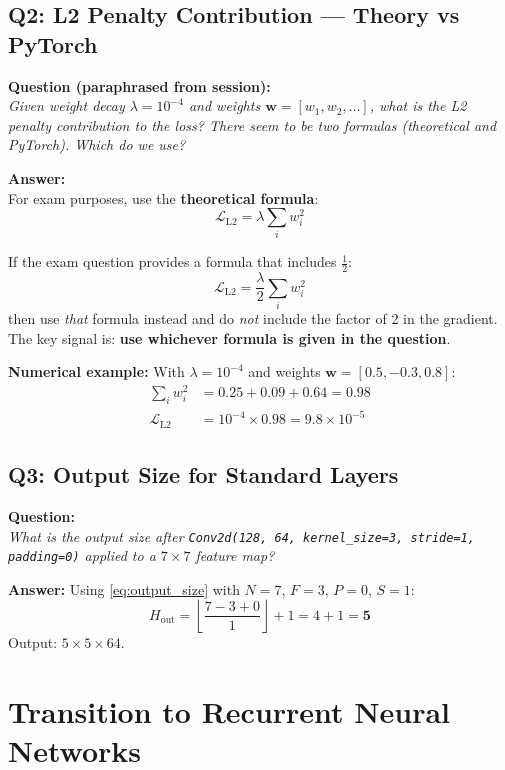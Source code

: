 \documentclass[12pt,a4paper]{article}
\newcommand{\floor}[1]{\left\lfloor #1 \right\rfloor}
\begin{document}
\subsection{Q2: L2 Penalty Contribution --- Theory vs PyTorch}

\textbf{Question (paraphrased from session):} \\
\textit{Given weight decay $\lambda = 10^{-4}$ and weights
$\mathbf{w} = [w_1, w_2, \ldots]$, what is the L2 penalty contribution to
the loss? There seem to be two formulas (theoretical and PyTorch). Which do
we use?}

\textbf{Answer:} \\
For exam purposes, use the \textbf{theoretical formula}:
\begin{equation}
  \mathcal{L}_{\mathrm{L2}} = \lambda \sum_i w_i^2
  \label{eq:l2_penalty_qa}
\end{equation}

If the exam question provides a formula that includes $\tfrac{1}{2}$:
\[
  \mathcal{L}_{\mathrm{L2}} = \frac{\lambda}{2} \sum_i w_i^2
\]
then use \emph{that} formula instead and do \emph{not} include the factor
of 2 in the gradient. The key signal is: \textbf{use whichever formula is
given in the question}.

\textbf{Numerical example:} With $\lambda = 10^{-4}$ and weights
$\mathbf{w} = [0.5, -0.3, 0.8]$:
\begin{align*}
  \sum_i w_i^2 &= 0.25 + 0.09 + 0.64 = 0.98 \\
  \mathcal{L}_{\mathrm{L2}} &= 10^{-4} \times 0.98 = 9.8 \times 10^{-5}
\end{align*}

\subsection{Q3: Output Size for Standard Layers}

\textbf{Question:} \\
\textit{What is the output size after \texttt{Conv2d(128, 64, kernel\_size=3,
stride=1, padding=0)} applied to a $7 \times 7$ feature map?}

\textbf{Answer:} Using \cref{eq:output_size} with $N=7$, $F=3$, $P=0$,
$S=1$:
\[
  H_{\mathrm{out}} = \floor{\frac{7 - 3 + 0}{1}} + 1 = 4 + 1 = \mathbf{5}
\]
Output: $5 \times 5 \times 64$.

\section{Transition to Recurrent Neural Networks}
\label{sec:rnn_preview}
\end{document}
